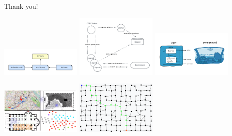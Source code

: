 \documentclass[presentation, 9pt]{beamer}\mode<presentation>{\usetheme{AMSBolognaFC}}
\begin{document}
\begin{frame}{}
\centering
\Huge{Thank you!}

\includegraphics[width=0.3\textwidth]{img/scarlib-modules.pdf}
\includegraphics[width=0.3\textwidth]{img/ctdesystem.pdf}
\includegraphics[width=0.3\textwidth]{img/simple-rl.png}



\includegraphics[width=0.3\textwidth]{img/alchemist}
\includegraphics[width=0.3\textwidth]{img/channel.png}

\end{frame}
\end{document}
